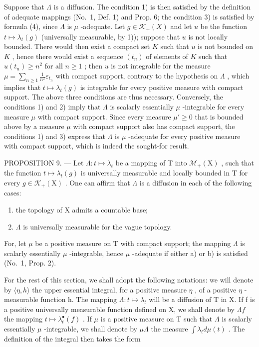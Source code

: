 Suppose that \(\Lambda\) is a diffusion. The condition 1) is then satisfied by the definition of adequate mappings (No.~1, Def. 1) and Prop. 6; the condition 3) is satisfied by formula (4), since \(\Lambda\) is \(\mu\) -adequate. Let \(g \in \mathcal{K}_{+}(X)\) and let \(u\) be the function \(t \mapsto \lambda_t(g)\) (universally measurable, by 1)); suppose that \(u\) is not locally bounded. There would then exist a compact set \(K\) such that \(u\) is not bounded on \(K\) , hence there would exist a sequence \((t_n)\) of elements of \(K\) such that \(u(t_n) \geqslant n^2\) for all \(n \geqslant 1\) ; then \(u\) is not integrable for the measure \(\mu = \sum_{n \geqslant 1} \frac{1}{n^2} \varepsilon_{t_n}\) with compact support, contrary to the hypothesis on \(\Lambda\) , which implies that \(t \mapsto \lambda_t(g)\) is integrable for every positive measure with compact support. The above three conditions are thus necessary. Conversely, the conditions 1) and 2) imply that \(\Lambda\) is scalarly essentially \(\mu\) -integrable for every measure \(\mu\) with compact support. Since every measure \(\mu' \geqslant 0\) that is bounded above by a measure \(\mu\) with compact support also has compact support, the conditions 1) and 3) express that \(\Lambda\) is \(\mu\) -adequate for every positive measure with compact support, which is indeed the sought-for result.

PROPOSITION 9. --- Let \(\Lambda : t \mapsto \lambda_t\) be a mapping of T into \(\mathcal{M}_+(\mathrm{X})\) , such that the function \(t \mapsto \lambda_t(g)\) is universally measurable and locally bounded in T for every \(g \in \mathcal{K}_+(\mathrm{X})\) . One can affirm that \(\Lambda\) is a diffusion in each of the following cases:

\begin{enumerate}
\def\labelenumi{\alph{enumi})}
\item
  the topology of X admits a countable base;
\item
  \(\Lambda\) is universally measurable for the vague topology.
\end{enumerate}

For, let \(\mu\) be a positive measure on T with compact support; the mapping \(\Lambda\) is scalarly essentially \(\mu\) -integrable, hence \(\mu\) -adequate if either a) or b) is satisfied (No.~1, Prop. 2).

For the rest of this section, we shall adopt the following notations: we will denote by \(\langle\eta,h\rangle\) the upper essential integral, for a positive measure \(\eta\) , of a positive \(\eta\) -measurable function h. The mapping \(\Lambda:t\mapsto\lambda_{t}\) will be a diffusion of T in X. If f is a positive universally measurable function defined on X, we shall denote by \(\Lambda f\) the mapping \(t\mapsto\lambda_{t}^{\bullet}(f)\) . If \(\mu\) is a positive measure on T such that \(\Lambda\) is scalarly essentially \(\mu\) -integrable, we shall denote by \(\mu\Lambda\) the measure \(\int\lambda_{t}d\mu(t)\) . The definition of the integral then takes the form

